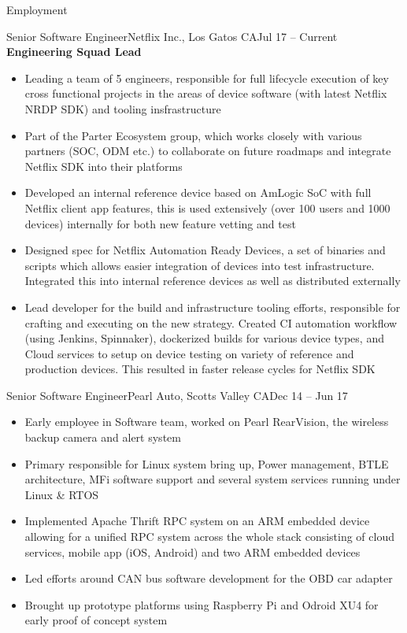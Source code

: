 \documentclass[]{mcdowellcv}
\begin{document}
	\makeheader
	
	\begin{cvsection}{Employment}
		\begin{cvsubsection}{Senior Software Engineer}{Netflix Inc., Los Gatos CA}{Jul 17 -- Current}
			\textbf{Engineering Squad Lead}
			\begin{itemize}
				\item Leading a team of 5 engineers, responsible for full lifecycle execution of key cross functional projects in the areas of device software (with latest Netflix NRDP SDK) and tooling insfrastructure 
				\item Part of the Parter Ecosystem group, which works closely with various partners (SOC, ODM etc.) to collaborate on future roadmaps and integrate Netflix SDK into their platforms 
				\item Developed an internal reference device based on AmLogic SoC with full Netflix client app features, this is used extensively (over 100 users and 1000 devices) internally for both new feature vetting and test
				\item Designed spec for Netflix Automation Ready Devices, a set of binaries and scripts which allows easier integration of devices into test infrastructure. Integrated this into internal reference devices as well as distributed externally
				\item Lead developer for the build and infrastructure tooling efforts, responsible for crafting and executing on the new strategy. Created CI automation workflow (using Jenkins, Spinnaker), dockerized builds for various device types, and Cloud services to setup on device testing on variety of reference and production devices. This resulted in faster release cycles for Netflix SDK
			\end{itemize}
		\end{cvsubsection}

		\begin{cvsubsection}{Senior Software Engineer}{Pearl Auto, Scotts Valley CA}{Dec 14 -- Jun 17}
			\begin{itemize}
				\item Early employee in Software team, worked on Pearl RearVision, the wireless backup camera and alert system
				\item Primary responsible for Linux system bring up, Power management, BTLE architecture, MFi software support and several system services running under Linux \& RTOS
				\item Implemented Apache Thrift RPC system on an ARM embedded device allowing for a unified RPC system across the whole stack consisting of cloud services, mobile app (iOS, Android) and two ARM embedded devices 
				\item Led efforts around CAN bus software development for the OBD car adapter
				\item Brought up prototype platforms using Raspberry Pi and Odroid XU4 for early proof of concept system
			\end{itemize}
		\end{cvsubsection}
		

\end{cvsection}
\end{document}
